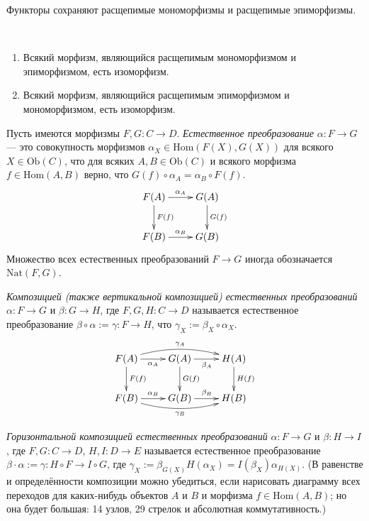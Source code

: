 \documentclass[12pt,a4paper]{article}
\newcommand{\Hom}{\mathrm{Hom}}
\newcommand{\Ob}{\mathrm{Ob}}
\newcommand{\Nat}{\mathrm{Nat}}
\begin{document}
    \begin{lemma}
        Функторы сохраняют расщепимые мономорфизмы и расщепимые эпиморфизмы.
    \end{lemma}

    \begin{lemma}\ 
        \begin{enumerate}
            \item Всякий морфизм, являющийся расщепимым мономорфизмом и эпиморфизмом, есть изоморфизм.
            \item Всякий морфизм, являющийся расщепимым эпиморфизмом и мономорфизмом, есть изоморфизм.
        \end{enumerate}
    \end{lemma}

    \begin{definition}
        Пусть имеются морфизмы $F, G: C \to D$. \emph{Естественное преобразование} $\alpha: F \to G$ --- это совокупность морфизмов $\alpha_X \in \Hom(F(X), G(X))$ для всякого $X \in \Ob(C)$, что для всяких $A, B \in \Ob(C)$ и всякого морфизма $f \in \Hom(A, B)$ верно, что $G(f) \circ \alpha_A = \alpha_B \circ F(f)$.
        \[
            \xymatrix{
                F(A) \ar[r]^{\alpha_A} \ar[d]^{F(f)} & G(A) \ar[d]^{G(f)}\\
                F(B) \ar[r]^{\alpha_B} & G(B)\\
            }
        \]
        Множество всех естественных преобразований $F \to G$ иногда обозначается $\Nat(F, G)$.

        \emph{Композицией (также вертикальной композицией) естественных преобразований} $\alpha: F \to G$ и $\beta: G \to H$, где $F, G, H: C \to D$ называется естественное преобразование $\beta \circ \alpha := \gamma
        : F \to H$, что $\gamma_X := \beta_X \circ \alpha_X$.
        \[
            \xymatrix{
                F(A) \ar[r]_{\alpha_A} \ar[d]^{F(f)} \ar@/^1em/[rr]^{\gamma_A} & G(A) \ar[r]_{\beta_A} \ar[d]^{G(f)} & H(A) \ar[d]^{H(f)}\\
                F(B) \ar[r]^{\alpha_B} \ar@/_1em/[rr]_{\gamma_B} & G(B) \ar[r]^{\beta_B} & H(B)\\
            }
        \]

        \emph{Горизонтальной композицией естественных преобразований} $\alpha: F \to G$ и $\beta: H \to I$, где $F, G: C \to D$, $H, I: D \to E$ называется естественное преобразование $\beta \cdot \alpha := \gamma: H \circ F \to I \circ G$, где $\gamma_X := \beta_{G(X)} H(\alpha_X) = I(\beta_X) \alpha_{H(X)}$. (В равенстве и определённости композиции можно убедиться, если нарисовать диаграмму всех переходов для каких-нибудь объектов $A$ и $B$ и морфизма $f \in \Hom(A, B)$; но она будет большая: 14 узлов, 29 стрелок и абсолютная коммутативность.)
        

\end{definition}
\end{document}

